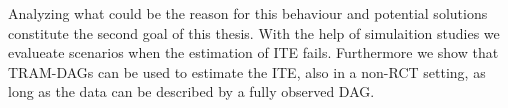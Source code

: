 Analyzing what could be the reason for this behaviour and potential solutions constitute the second goal of this thesis. With the help of simulaition studies we evalueate scenarios when the estimation of ITE fails. Furthermore we show that TRAM-DAGs can be used to estimate the ITE, also in a non-RCT setting, as long as the data can be described by a fully observed DAG.







